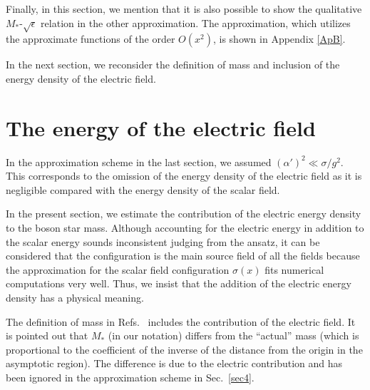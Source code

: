 \documentclass[
aps,prd,
12pt,%
nopreprintnumbers,
showpacs,
eqsecnum,
nofootinbib
]{revtex4-1}
\begin{document}
Finally, in this section, we mention that it is also possible to show the
qualitative
$M_*$-$\sqrt{\epsilon}$ relation
in the other approximation. 
The approximation, which utilizes the approximate functions of the order $O(x^2)$,
is shown in Appendix \ref{ApB}.

In the next section, we reconsider the definition of mass and inclusion of the
energy density of the electric field.

\section{The energy of the electric field}
\label{sec5}
In the approximation scheme in the last section,
we assumed $(\alpha')^2\ll\sigma/g^2$.
This corresponds to the omission of the energy density of the electric field
as it is negligible compared with the energy density of the scalar field.

In the present section, we estimate the contribution of the electric energy
density to the boson star mass.
Although accounting for the electric energy in addition to the scalar energy
sounds inconsistent judging from the ansatz,
it can be considered that the configuration is the main source field of
all the fields
because the approximation for the scalar field
configuration
$\sigma(x)$ fits numerical computations very well.
Thus, we insist that the addition of the electric energy density has a physical
meaning.

The definition of mass in Refs.~\cite{Jetzer,JB} includes the contribution of
the electric field.
It is pointed out \cite{PQRR} that $M_*$ (in our notation) differs from
the ``actual'' mass (which is proportional to the coefficient of the inverse of
the distance from the origin in the asymptotic region). The difference is due to
the electric contribution and has been ignored in the approximation scheme in
Sec.~\ref{sec4}.
\end{document}
